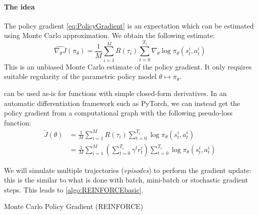 \documentclass[12pt]{report}
\begin{document}
\paragraph{The idea} The policy gradient \eqref{eq:PolicyGradient} is an expectation which can be estimated using Monte Carlo approximation. We obtain the following estimate:
\begin{equation}\label{eq:MCPolicyGrad}
	\widehat{\nabla_\theta J}(\pi_\theta) =
	\frac{1}{M}\sum_{i=1}^M R(\tau_i)
	\sum_{t=0}^{T_i}
	\nabla_\theta
	\log\pi_\theta(s_t^i, a_t^i)
\end{equation}
This is an unbiased Monte Carlo estimate of the policy gradient. It only requires suitable regularity of the parametric policy model $\theta \longmapsto \pi_\theta$.


\begin{remark}\label{rmk:PolicyGradPseudoLoss}  can be used as-is for functions with simple closed-form derivatives.
In an automatic differentiation framework such as {\normalfont\sffamily PyTorch}, we can instead get the policy gradient from a computational graph with the following pseudo-loss function:
\begin{equation}\label{eq:PolicyGradPseudoLoss}
\begin{aligned}
	\tilde{J}(\theta)
	&= \frac{1}{M}\sum_{i=1}^M R(\tau_i)
	\sum_{t=0}^{T_i} \log\pi_\theta(s_t^i, a_t^i)\\
	&=
	\frac{1}{M}\sum_{i=1}^M
	\left(
		\sum_{t=0}^{T_i} \gamma^t r^i_{t}
	\right)
	\sum_{t=0}^{T_i} \log\pi_\theta(s_t^i, a_t^i)
\end{aligned}
\end{equation}
\end{remark}

We will simulate multiple trajectories (\textit{episodes}) to perform the gradient update: this is the similar to what is done with batch, mini-batch or stochastic gradient steps. This leads to \cref{algo:REINFORCEbasic}.

\begin{algorithm}[H]
\caption{Monte Carlo Policy Gradient (REINFORCE)}\label{algo:REINFORCEbasic}
\end{algorithm}
\end{document}
